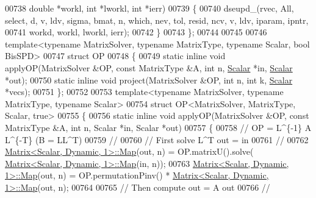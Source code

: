 \begin{DoxyCode}
00738       \textcolor{keywordtype}{double} *workl, \textcolor{keywordtype}{int} *lworkl, \textcolor{keywordtype}{int} *ierr)
00739   \{
00740     dseupd\_(rvec, All, select, d, v, ldv, sigma, bmat, n, which, nev, tol, resid, ncv, v, ldv, iparam, 
      ipntr,
00741         workd, workl, lworkl, ierr);
00742   \}
00743 \};
00744 
00745 
00746 \textcolor{keyword}{template}<\textcolor{keyword}{typename} MatrixSolver, \textcolor{keyword}{typename} MatrixType, \textcolor{keyword}{typename} Scalar, \textcolor{keywordtype}{bool} BisSPD>
00747 \textcolor{keyword}{struct }OP
00748 \{
00749     \textcolor{keyword}{static} \textcolor{keyword}{inline} \textcolor{keywordtype}{void} applyOP(MatrixSolver &OP, \textcolor{keyword}{const} MatrixType &A, \textcolor{keywordtype}{int} n, 
      \hyperlink{class_eigen_1_1_arpack_generalized_self_adjoint_eigen_solver_ab1182405bfe87a505d4b7a8311c661ec}{Scalar} *in, \hyperlink{class_eigen_1_1_arpack_generalized_self_adjoint_eigen_solver_ab1182405bfe87a505d4b7a8311c661ec}{Scalar} *out);
00750     \textcolor{keyword}{static} \textcolor{keyword}{inline} \textcolor{keywordtype}{void} project(MatrixSolver &OP, \textcolor{keywordtype}{int} n, \textcolor{keywordtype}{int} k, \hyperlink{class_eigen_1_1_arpack_generalized_self_adjoint_eigen_solver_ab1182405bfe87a505d4b7a8311c661ec}{Scalar} *vecs);
00751 \};
00752 
00753 \textcolor{keyword}{template}<\textcolor{keyword}{typename} MatrixSolver, \textcolor{keyword}{typename} MatrixType, \textcolor{keyword}{typename} Scalar>
00754 \textcolor{keyword}{struct }OP<MatrixSolver, MatrixType, Scalar, true>
00755 \{
00756   \textcolor{keyword}{static} \textcolor{keyword}{inline} \textcolor{keywordtype}{void} applyOP(MatrixSolver &OP, \textcolor{keyword}{const} MatrixType &A, \textcolor{keywordtype}{int} n, Scalar *in, Scalar *out)
00757 \{
00758     \textcolor{comment}{// OP = L^\{-1\} A L^\{-T\}  (B = LL^T)}
00759     \textcolor{comment}{//}
00760     \textcolor{comment}{// First solve L^T out = in}
00761     \textcolor{comment}{//}
00762     \hyperlink{group___core___module_class_eigen_1_1_matrix}{Matrix<Scalar, Dynamic, 1>::Map}(out, n) = OP.matrixU().solve(
      \hyperlink{group___core___module_class_eigen_1_1_matrix}{Matrix<Scalar, Dynamic, 1>::Map}(in, n));
00763     \hyperlink{group___core___module_class_eigen_1_1_matrix}{Matrix<Scalar, Dynamic, 1>::Map}(out, n) = OP.permutationPinv() * 
      \hyperlink{group___core___module_class_eigen_1_1_matrix}{Matrix<Scalar, Dynamic, 1>::Map}(out, n);
00764 
00765     \textcolor{comment}{// Then compute out = A out}
00766     \textcolor{comment}{//}

\end{DoxyCode}
